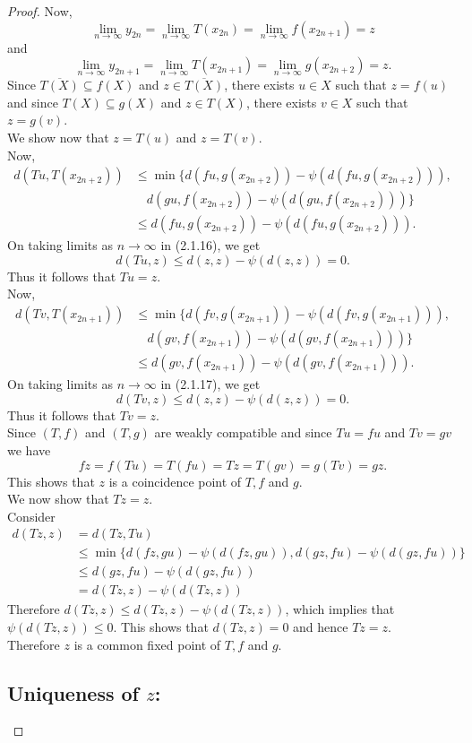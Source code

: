 \documentclass[11]{article}
\numberwithin{equation}{definition}
\begin{document}
\begin{proof}
Now,
\[
\lim_{n\to\infty}y_{2n}=\lim_{n\to\infty}T(x_{2n})=\lim_{n\to\infty}f(x_{2n+1})=z
\]
and
\[
\lim_{n\to\infty}y_{2n+1}=\lim_{n\to\infty}T(x_{2n+1})=\lim_{n\to\infty}g(x_{2n+2})=z.
\]
Since $\overline{T(X)}\subseteq f(X)$ and $z\in\overline{T(X)}$, there exists $u\in X$ such that $z=f(u)$ and since $T(X)\subseteq g(X)$ and $z\in T(X)$, there exists $v\in X$ such that $z=g(v)$.\\
We show now that $z=T(u)$ and $z=T(v)$.\\
Now,
\begin{align}
d(Tu,T(x_{2n+2})) &\leq \min\{d(fu,g(x_{2n+2}))-\psi(d(fu,g(x_{2n+2}))), \nonumber \\
&\quad d(gu,f(x_{2n+2}))-\psi(d(gu,f(x_{2n+2})))\} \nonumber \\
&\leq d(fu,g(x_{2n+2}))-\psi(d(fu,g(x_{2n+2}))).
\end{align}
On taking limits as $n\to\infty$ in (2.1.16), we get
\[
d(Tu,z) \leq d(z,z)-\psi(d(z,z)) = 0.
\]
Thus it follows that $Tu=z$.\\
Now,
\begin{align}
d(Tv,T(x_{2n+1})) &\leq \min\{d(fv,g(x_{2n+1}))-\psi(d(fv,g(x_{2n+1}))), \nonumber \\
&\quad d(gv,f(x_{2n+1}))-\psi(d(gv,f(x_{2n+1})))\} \nonumber \\
&\leq d(gv,f(x_{2n+1}))-\psi(d(gv,f(x_{2n+1}))).
\end{align}
On taking limits as $n\to\infty$ in (2.1.17), we get
\[
d(Tv,z) \leq d(z,z)-\psi(d(z,z)) = 0.
\]
Thus it follows that $Tv=z$.\\
Since $(T,f)$ and $(T,g)$ are weakly compatible and since $Tu=fu$ and $Tv=gv$ we have
\[
fz=f(Tu)=T(fu)=Tz=T(gv)=g(Tv)=gz.
\]
This shows that $z$ is a coincidence point of $T,f$ and $g$.\\
We now show that $Tz=z$.\\
Consider
\begin{align*}
d(Tz,z) &= d(Tz,Tu) \\
&\leq \min\{d(fz,gu)-\psi(d(fz,gu)),d(gz,fu)-\psi(d(gz,fu))\} \\
&\leq d(gz,fu)-\psi(d(gz,fu)) \\
&= d(Tz,z)-\psi(d(Tz,z))
\end{align*}
Therefore $d(Tz,z)\leq d(Tz,z)-\psi(d(Tz,z))$, which implies that $\psi(d(Tz,z))\leq 0$. This shows that $d(Tz,z)=0$ and hence $Tz=z$.\\
Therefore $z$ is a common fixed point of $T,f$ and $g$.

\subsection*{Uniqueness of $z$:}


\end{proof}
\end{document}
